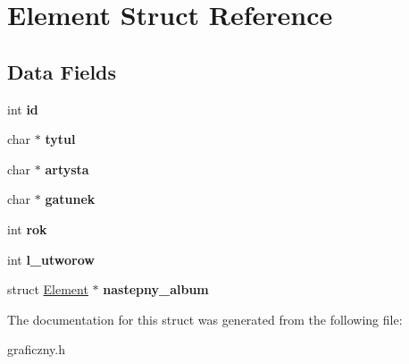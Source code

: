 \hypertarget{struct_element}{}\section{Element Struct Reference}
\label{struct_element}
\subsection*{Data Fields}
\begin{DoxyCompactItemize}
\item 
\mbox{\label{struct_element_a7441ef0865bcb3db9b8064dd7375c1ea}} 
int {\bfseries id}
\item 
\mbox{\label{struct_element_a13b4627c70f2655d20b089c5c7bf81eb}} 
char $\ast$ {\bfseries tytul}
\item 
\mbox{\label{struct_element_a4d403581d9c82ed275d4103f637db2b0}} 
char $\ast$ {\bfseries artysta}
\item 
\mbox{\label{struct_element_a7604e9c187ec913862672cef004fb718}} 
char $\ast$ {\bfseries gatunek}
\item 
\mbox{\label{struct_element_ab216bb7eaebb4b2665b3a7e9d52d98d0}} 
int {\bfseries rok}
\item 
\mbox{\label{struct_element_a1998478ee250b5a2c942559e0433eda5}} 
int {\bfseries l\+\_\+utworow}
\item 
\mbox{\label{struct_element_a0a230736b0d11fe22db3f9e1431f9c91}} 
struct \hyperlink{struct_element}{Element} $\ast$ {\bfseries nastepny\+\_\+album}
\end{DoxyCompactItemize}


The documentation for this struct was generated from the following file\+:\begin{DoxyCompactItemize}
\item 
graficzny.\+h\end{DoxyCompactItemize}
